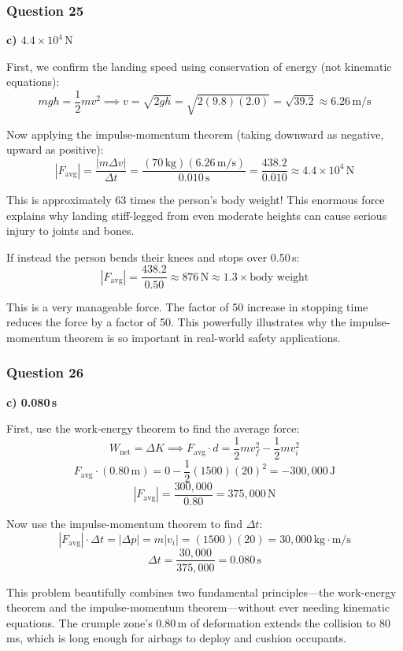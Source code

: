 \documentclass[12pt,letterpaper]{article}
\begin{document}
\subsubsection*{Question 25}

\begin{answerbox}
\textbf{c) $4.4 \times 10^4\,\text{N}$}
\end{answerbox}

\begin{explanationbox}
First, we confirm the landing speed using conservation of energy (not kinematic equations):
\[
mgh = \frac{1}{2}mv^2 \implies v = \sqrt{2gh} = \sqrt{2(9.8)(2.0)} = \sqrt{39.2} \approx 6.26\,\text{m/s}
\]

Now applying the impulse-momentum theorem (taking downward as negative, upward as positive):
\[
|F_{\text{avg}}| = \frac{|m \Delta v|}{\Delta t} = \frac{(70\,\text{kg})(6.26\,\text{m/s})}{0.010\,\text{s}} = \frac{438
.2}{0.010} \approx 4.4 \times 10^4\,\text{N}
\]

This is approximately 63 times the person's body weight! This enormous force explains why landing stiff-legged from even moderate heights can cause serious injury to joints and bones.

If instead the person bends their knees and stops over 0.50\,s:
\[
|F_{\text{avg}}| = \frac{438.2}{0.50} \approx 876\,\text{N} \approx 1.3 \times \text{body weight}
\]

This is a very manageable force. The factor of 50 increase in stopping time reduces the force by a factor of 50. This powerfully illustrates why the impulse-momentum theorem is so important in real-world safety applications.
\end{explanationbox}

\subsubsection*{Question 26}

\begin{answerbox}
\textbf{c) 0.080\,s}
\end{answerbox}

\begin{explanationbox}
First, use the work-energy theorem to find the average force:
\[
W_{\text{net}} = \Delta K \implies F_{\text{avg}} \cdot d = \frac{1}{2}mv_f^2 - \frac{1}{2}mv_i^2
\]
\[
F_{\text{avg}} \cdot (0.80\,\text{m}) = 0 - \frac{1}{2}(1500)(20)^2 = -300{,}000\,\text{J}
\]
\[
|F_{\text{avg}}| = \frac{300{,}000}{0.80} = 375{,}000\,\text{N}
\]

Now use the impulse-momentum theorem to find $\Delta t$:
\[
|F_{\text{avg}}| \cdot \Delta t = |\Delta p| = m|v_i| = (1500)(20) = 30{,}000\,\text{kg}\cdot\text{m/s}
\]
\[
\Delta t = \frac{30{,}000}{375{,}000} = 0.080\,\text{s}
\]

This problem beautifully combines two fundamental principles---the work-energy theorem and the impulse-momentum theorem---without ever needing kinematic equations. The crumple zone's 0.80\,m of deformation extends the collision to 80\,ms, which is long enough for airbags to deploy and cushion occupants.
\end{explanationbox}
\end{document}
